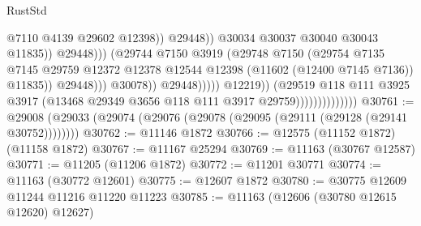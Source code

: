 \begin{lexlean}{RustStd}
\begin{coremodule}
                                                                    @7110
                                                                    @4139
                                                                    @29602
                                                                    @12398))
                                                                @29448))
                                                            @30034
                                                            @30037
                                                            @30040
                                                            @30043
                                                            @11835))
                                                        @29448)))
                                                  (@29744
                                                    @7150
                                                    @3919
                                                    (@29748
                                                      @7150
                                                      (@29754
                                                        @7135
                                                        @7145
                                                        @29759
                                                        @12372
                                                        @12378
                                                        @12544
                                                        @12398
                                                        (@11602 (@12400 @7145 @7136))
                                                        @11835))
                                                    @29448)))
                                              @30078))
                                          @29448)))))
                                @12219))
                            (@29519
                              @118
                              @111
                              @3925
                              @3917
                              (@13468 @29349 @3656 @118 @111 @3917 @29759))))))))))))))
@30761 := @29008 (@29033 (@29074 (@29076 (@29078 (@29095 (@29111 (@29128 (@29141 @30752))))))))
@30762 := @11146 @1872
@30766 := @12575 (@11152 @1872) (@11158 @1872)
@30767 := @11167 @25294
@30769 := @11163 (@30767 @12587)
@30771 := @11205 (@11206 @1872)
@30772 := @11201 @30771
@30774 := @11163 (@30772 @12601)
@30775 := @12607 @1872
@30780 := @30775 @12609 @11244 @11216 @11220 @11223
@30785 := @11163 (@12606 (@30780 @12615 @12620) @12627)

\end{coremodule}
\end{lexlean}

